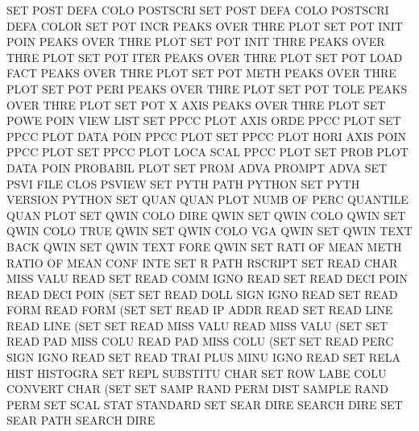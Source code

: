 SET      POST DEFA COLO                 POSTSCRI
SET      POST DEFA COLO                 POSTSCRI DEFA COLOR
SET      POT  INCR                      PEAKS    OVER THRE PLOT
SET      POT  INIT POIN                 PEAKS    OVER THRE PLOT
SET      POT  INIT THRE                 PEAKS    OVER THRE PLOT
SET      POT  ITER                      PEAKS    OVER THRE PLOT
SET      POT  LOAD FACT                 PEAKS    OVER THRE PLOT
SET      POT  METH                      PEAKS    OVER THRE PLOT
SET      POT  PERI                      PEAKS    OVER THRE PLOT
SET      POT  TOLE                      PEAKS    OVER THRE PLOT
SET      POT  X    AXIS                 PEAKS    OVER THRE PLOT
SET      POWE POIN VIEW                 LIST
SET      PPCC PLOT AXIS ORDE            PPCC     PLOT
SET      PPCC PLOT DATA POIN            PPCC     PLOT
SET      PPCC PLOT HORI AXIS POIN       PPCC     PLOT
SET      PPCC PLOT LOCA SCAL            PPCC     PLOT
SET      PROB PLOT DATA POIN            PROBABIL PLOT
SET      PROM ADVA                      PROMPT   ADVA
SET      PSVI FILE CLOS                 PSVIEW
SET      PYTH PATH                      PYTHON
SET      PYTH VERSION                   PYTHON
SET      QUAN QUAN PLOT NUMB OF   PERC  QUANTILE QUAN PLOT
SET      QWIN COLO DIRE                 QWIN
SET      QWIN COLO                      QWIN
SET      QWIN COLO TRUE                 QWIN
SET      QWIN COLO VGA                  QWIN
SET      QWIN TEXT BACK                 QWIN
SET      QWIN TEXT FORE                 QWIN
SET      RATI OF   MEAN METH            RATIO   OF    MEAN CONF INTE
SET      R    PATH                      RSCRIPT
SET      READ CHAR MISS VALU            READ
SET      READ COMM IGNO                 READ
SET      READ DECI POIN                 READ     DECI POIN (SET
SET      READ DOLL SIGN IGNO            READ
SET      READ FORM                      READ     FORM (SET
SET      READ IP   ADDR                 READ
SET      READ LINE                      READ     LINE (SET
SET      READ MISS VALU                 READ     MISS VALU (SET
SET      READ PAD  MISS COLU            READ     PAD  MISS COLU (SET
SET      READ PERC SIGN IGNO            READ
SET      READ TRAI PLUS MINU IGNO       READ
SET      RELA HIST                      HISTOGRA
SET      REPL                           SUBSTITU CHAR
SET      ROW  LABE COLU                 CONVERT  CHAR (SET
SET      SAMP RAND PERM DIST            SAMPLE   RAND PERM
SET      SCAL STAT                      STANDARD
SET      SEAR DIRE                      SEARCH   DIRE
SET      SEAR PATH                      SEARCH   DIRE
